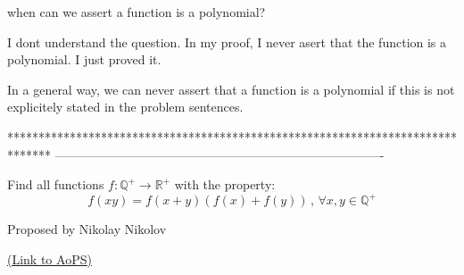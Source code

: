 \begin{solution}
	\begin{tcolorbox}when can we assert a function is a polynomial?\end{tcolorbox}
I dont understand the question.
In my proof, I never asert that the function is a polynomial. I just proved it.

In a general way, we can never assert that a function is a polynomial if this is not explicitely stated in the problem sentences.
\end{solution}
*******************************************************************************
-------------------------------------------------------------------------------

\begin{problem}
	Find all functions $f: \mathbb{Q}^+ \to \mathbb{R}^+ $ with the property:
\[f(xy)=f(x+y)(f(x)+f(y)) \,,\, \forall x,y \in \mathbb{Q}^+\]

\begin{italicized}Proposed by Nikolay Nikolov\end{italicized}
	\flushright \href{https://artofproblemsolving.com/community/c6h591459}{(Link to AoPS)}
\end{problem}



